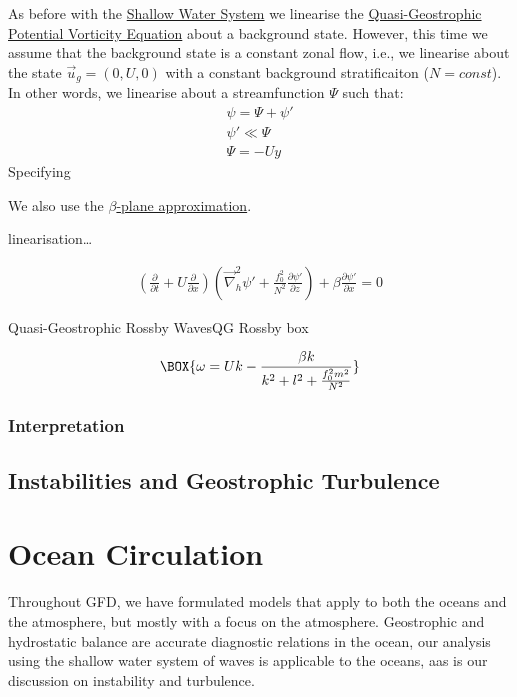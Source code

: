 As before with the \hyperref[Shallow Water System]{Shallow Water System} we linearise the \hyperref[QGPV]{Quasi-Geostrophic Potential Vorticity Equation} about a background state. However, this time we assume that the background state is a constant zonal flow, i.e., we linearise about the state $\vec{u}_g=(0,U,0)$ with a constant background stratificaiton ($N=const$). In other words, we linearise about a streamfunction $\Psi$ such that:
\begin{align*}
    \psi = \Psi + \psi'
    \\
    \psi' \ll \Psi
    \\
    \Psi = -Uy
\end{align*}
Specifying 

We also use the \hyperref[beta plane box]{$\beta$-plane approximation}.

linearisation\dots

\begin{align*}
    \left( \frac{\partial }{\partial t}+U\frac{\partial }{\partial x} \right)
    \left( 
        \vec{\nabla}_h^2 \psi' 
        +\frac{f_0^2}{N^2}\frac{\partial \psi'}{\partial z}
     \right)
    +
    \beta \frac{\partial \psi' }{\partial x}
    =
    0
\end{align*}

\begin{fact}{Quasi-Geostrophic Rossby Waves}{QG Rossby box}\label{QG Rossby box}

    \begin{gather}
        \BOX{
            \omega = Uk - \frac{\beta k}{k^2 + l^2 +\frac{f_0^2 m^2}{N^2}}
        }
    \end{gather}
\end{fact}

\subsection{Interpretation}



\section{Instabilities and Geostrophic Turbulence}

\chapter{Ocean Circulation}\label{Oceans}

Throughout GFD, we have formulated models that apply to both the oceans and the atmosphere, but mostly with a focus on the atmosphere. Geostrophic and hydrostatic balance are accurate diagnostic relations in the ocean, our analysis using the shallow water system of waves is applicable to the oceans, aas is our discussion on instability and turbulence.

